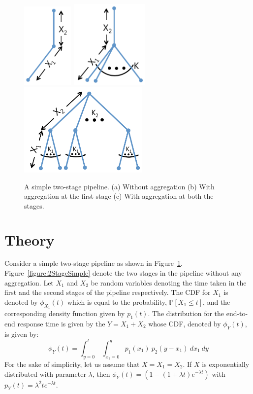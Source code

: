 \documentclass[letterpaper,twocolumn,10pt]{article}
\begin{document}
\begin{figure}[t]
  \centering
  \subfloat
  {
    \includegraphics[width=1in]{Figures/2Stage.pdf}
    \label{figure:2StageSimple}
  }
  \hspace{0.5in}
  \subfloat
  {
    \includegraphics[width=1.5in]{Figures/2StageAggregation.pdf}
    \label{figure:2StageAggregation}
  }
  \hspace{0.5in}
    \subfloat
  {
    \includegraphics[width=2.5in]{Figures/2StageAggregationFull.pdf}
    \label{figure:2StageAggregationFull}
  }
    \caption{A simple two-stage pipeline. (a) Without aggregation (b) With aggregation at the first stage (c) With aggregation at both the stages.}
  \label{figure:2Stage}
\end{figure}



\section{Theory}
Consider a simple two-stage pipeline as shown in Figure~\ref{figure:2Stage}. 
Figure~\ref{figure:2StageSimple} denote the two stages in the pipeline without any aggregation. 
Let $X_1$ and $X_2$ be random variables denoting the time taken in the first and the second stages of the pipeline respectively. 
The CDF for $X_1$ is denoted by $\phi_{X_1}(t)$ which is equal to the probability, $\mathbb{P}[X_1 \leq t]$, and the corresponding density function given by $p_1(t)$.
The distribution for the end-to-end response time is given by the $Y = X_1 + X_2$ whose CDF, denoted by $\phi_{Y}(t)$, is given by:
$$
\phi_Y(t) = \int_{y = 0}^t \ \int_{x_1 = 0}^{y} p_1(x_1) \  p_2(y - x_1) \ dx_1 \  dy
$$
For the sake of simplicity, let us assume that $X = X_1 = X_2$. If $X$ is exponentially distributed with parameter $\lambda$, then $\phi_Y(t) = (1 - (1 + \lambda t) e^{-\lambda t})$
with $p_Y(t) = \lambda^2 t e^{-\lambda t}$.
\end{document}
